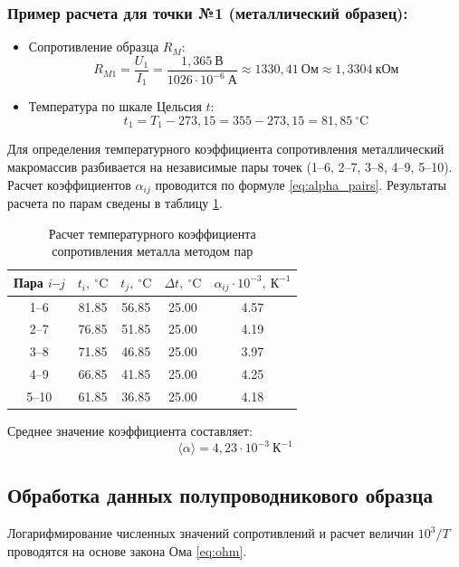 \documentclass[12pt]{article}
\begin{document}
\subsubsection*{Пример расчета для точки №1 (металлический образец):}
\begin{itemize}
    \item Сопротивление образца $R_M$:
    \begin{equation}
        R_{M1} = \frac{U_1}{I_1} = \frac{1{,}365~\text{В}}{1026 \cdot 10^{-6}~\text{А}} \approx 1330{,}41~\text{Ом} \approx 1{,}3304~\text{кОм}
    \end{equation}
    \item Температура по шкале Цельсия $t$:
    \begin{equation}
        t_1 = T_1 - 273{,}15 = 355 - 273{,}15 = 81{,}85~^{\circ}\text{C}
    \end{equation}
\end{itemize}

Для определения температурного коэффициента сопротивления металлический макромассив разбивается на независимые пары точек (1–6, 2–7, 3–8, 4–9, 5–10). Расчет коэффициентов $\alpha_{ij}$ проводится по формуле \eqref{eq:alpha_pairs}. Результаты расчета по парам сведены в таблицу \ref{tab:metal_pairs}.

\begin{table}[H]
\centering
\caption{Расчет температурного коэффициента сопротивления металла методом пар}
\label{tab:metal_pairs}
\vspace{0.2cm}
\small
\begin{tabular}{ccccc}
\toprule
Пара $i$--$j$ & $t_i, ~^{\circ}\text{C}$ & $t_j, ~^{\circ}\text{C}$ & $\Delta t, ~^{\circ}\text{C}$ & $\alpha_{ij} \cdot 10^{-3}, ~\text{К}^{-1}$ \\
\midrule
1--6  & 81.85 & 56.85 & 25.00 & 4.57 \\
2--7  & 76.85 & 51.85 & 25.00 & 4.19 \\
3--8  & 71.85 & 46.85 & 25.00 & 3.97 \\
4--9  & 66.85 & 41.85 & 25.00 & 4.25 \\
5--10 & 61.85 & 36.85 & 25.00 & 4.18 \\
\bottomrule
\end{tabular}
\end{table}

Среднее значение коэффициента составляет:
$$ \langle \alpha \rangle = 4{,}23 \cdot 10^{-3}~\text{К}^{-1} $$

\subsection{Обработка данных полупроводникового образца}
Логарифмирование численных значений сопротивлений и расчет величин $10^3/T$ проводятся на основе закона Ома \eqref{eq:ohm}.
\end{document}
